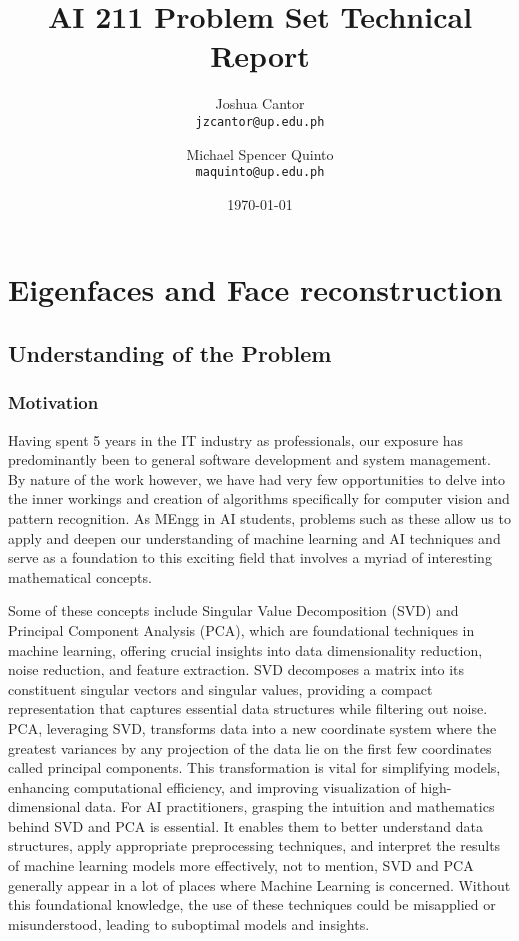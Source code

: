 \documentclass{article} %
\title{AI 211 Problem Set Technical Report} %
\author{
  Joshua Cantor\\
  \texttt{jzcantor@up.edu.ph}
  \and
  Michael Spencer Quinto\\
  \texttt{maquinto@up.edu.ph}
}
\date{\today} %
\theoremstyle{definition}
\theoremstyle{remark}
\theoremstyle{plain}
\begin{document}
\maketitle %

\section{Eigenfaces and Face reconstruction}

\subsection{Understanding of the Problem}
    \subsubsection{Motivation}
        Having spent 5 years in the IT industry as professionals, our exposure has predominantly been to general software development and system management. By nature of the work however, we have had very few opportunities to delve into the inner workings and creation of algorithms specifically for computer vision and pattern recognition. As MEngg in AI students, problems such as these allow us to apply and deepen our understanding of machine learning and AI techniques and serve as a foundation to this exciting field that involves a myriad of interesting mathematical concepts.

        Some of these concepts include Singular Value Decomposition (SVD) and Principal Component Analysis (PCA), which are foundational techniques in machine learning, offering crucial insights into data dimensionality reduction, noise reduction, and feature extraction. SVD decomposes a matrix into its constituent singular vectors and singular values, providing a compact representation that captures essential data structures while filtering out noise. PCA, leveraging SVD, transforms data into a new coordinate system where the greatest variances by any projection of the data lie on the first few coordinates called principal components. This transformation is vital for simplifying models, enhancing computational efficiency, and improving visualization of high-dimensional data. For AI practitioners, grasping the intuition and mathematics behind SVD and PCA is essential. It enables them to better understand data structures, apply appropriate preprocessing techniques, and interpret the results of machine learning models more effectively, not to mention, SVD and PCA generally appear in a lot of places where Machine Learning is concerned. Without this foundational knowledge, the use of these techniques could be misapplied or misunderstood, leading to suboptimal models and insights. 
        
\end{document}
